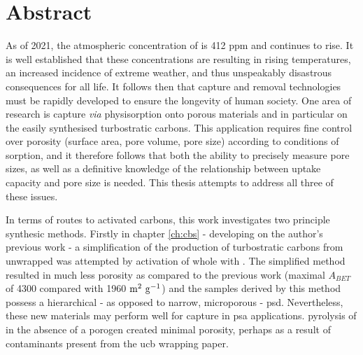 \cleardoublepage

\chapter*{Abstract} \label{Abstract}

As of 2021, the atmospheric concentration of  is 412 ppm and continues to rise. It is well established that these concentrations are resulting in rising temperatures, an increased incidence of extreme weather, and thus unspeakably disastrous consequences for all life. It follows then that  capture and removal technologies must be rapidly developed to ensure the longevity of human society. One area of research is  capture \textit{via} physisorption onto porous materials and in particular on the easily synthesised \glspl{turbostratic carbon}. This application requires fine control over porosity (surface area, pore volume, pore size) according to conditions of sorption, and it therefore follows that both the ability to precisely measure pore sizes, as well as a definitive knowledge of the relationship between  uptake capacity and pore size is needed. This thesis attempts to address all three of these issues.

In terms of routes to \glspl{activated carbon}, this work investigates two principle synthesic methods. Firstly in chapter \ref{ch:cbs} - developing on the author's previous work - a simplification of the production of \glspl{turbostratic carbon} from unwrapped  was attempted by \gls{activation} of whole  with . The simplified method resulted in much less porosity as compared to the previous work (maximal $A_{BET}$ of 4300 compared with 1960 $\rm m^2\ g^{-1}$) and the samples derived by this method possess a hierarchical - as opposed to narrow, microporous - \acrfull{psd}. Nevertheless, these new materials may perform well for  capture in \acrfull{psa} applications. \Gls{pyrolysis} of  in the absence of a \gls{porogen} created minimal porosity, perhaps as a result of contaminants present from the \acrshort{ucb} wrapping paper. 

